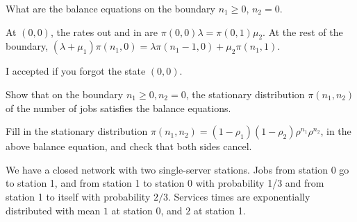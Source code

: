\begin{exercise}[201804]
 What are the balance equations on the boundary $n_1\geq 0$, $n_2=0$. 
\begin{solution}
 At $(0,0)$, the rates out and in are $\pi(0,0)\lambda = \pi(0,1)\mu_2$. At the rest of the boundary, $(\lambda+\mu_1) \pi(n_1, 0) = \lambda \pi(n_1-1, 0) + \mu_2\pi(n_1, 1)$. 

I accepted if you forgot the state $(0,0)$. 
\end{solution}
\end{exercise}

\begin{exercise}[201804]
Show that on the boundary $n_1\geq0, n_2=0$, the stationary distribution $\pi(n_1, n_2)$ of the number of jobs satisfies the balance equations.
\begin{solution}
 Fill in the stationary distribution $\pi(n_1,n_2)=(1-\rho_1)(1-\rho_2)\rho^{n_1}\rho^{n_2}$, in the above balance equation, and check that both sides cancel. 
\end{solution}
\end{exercise}


\begin{comment}

The solution is in the formula sheet!

 \begin{center}
\begin{tikzpicture}[scale=1,
 >=stealth',
 circ/.style={
 circle, 
 draw=black,
 thick,
 minimum size=1.cm,
 inner sep=0pt,
 text centered
 },
 pil/.style={
 ->,
 thick,
 shorten <=2pt,
 shorten >=2pt}
]

\node[circ] (0) {$(0,0)$};
\node[circ, right=of 0] (1) {$(1,0)$}
edge[pil, <-] node[midway, above] {$\lambda$} (0); 
\node[circ, above=of 0] (2) {$(0,1)$}
edge[pil, <-] node[midway, above] {$\mu_1$} (1)
edge[pil, ->] node[midway, left] {$\mu_2$} (0);
\end{tikzpicture}
 
 \end{center}
\end{comment}


We have a closed network with two single-server stations. Jobs from station 0 go to station 1, and from station 1 to station 0 with probability 1/3 and from station 1 to itself with probability $2/3$. Services times are exponentially distributed with mean $1$ at station $0$, and $2$ at station 1.

